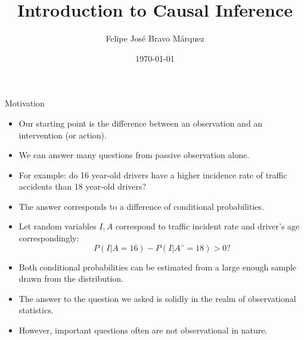 \documentclass[handout]{beamer}
\title{Introduction to Causal Inference}
\author[Felipe Bravo Márquez]{\footnotesize
 \textcolor[rgb]{0.00,0.00,1.00}{Felipe José Bravo Márquez}}
\date{ \today }
\begin{document}
\begin{frame}
\titlepage


\end{frame}




\begin{frame}{Motivation}
\scriptsize{
\begin{itemize}
\item Our starting point is the difference between an observation and an intervention (or action). 
\item We can answer many questions from passive observation alone.
\item For example: do 16 year-old drivers have a higher incidence rate of traffic accidents than 18 year-old drivers? 
\item The answer corresponds to a difference of conditional probabilities.

\item Let random variables $I,A$ correspond to traffic incident rate and driver's age correspondingly:
\begin{displaymath}
 P(I|A=16)-P(I|A¨=18)>0?
\end{displaymath}


\item Both conditional probabilities can be estimated from a large enough sample drawn from the distribution.

\item The answer to the question we asked is solidly in the realm of observational statistics.

\item However, important questions often are not observational in nature.

\end{itemize}


} 

\end{frame}
\end{document}
